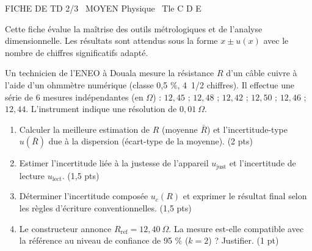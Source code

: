 \documentclass[11pt]{article}
\begin{document}
\begin{tcolorbox}[enhanced,colback=popink,colframe=popink,arc=10pt,boxrule=0pt,left=12pt,right=12pt,top=9pt,bottom=9pt]
{\color{white}\popxbold\small FICHE DE TD 2/3 \textbullet\ MOYEN \hfill Physique \textbullet\ Tle C D E\par}
\end{tcolorbox}
\vspace{4pt}
Cette fiche évalue la maîtrise des outils métrologiques et de l'analyse dimensionnelle. Les résultats sont attendus sous la forme $x \pm u(x)$ avec le nombre de chiffres significatifs adapté.

\begin{exercice}
Un technicien de l'ENEO à Douala mesure la résistance $R$ d'un câble cuivre à l'aide d'un ohmmètre numérique (classe 0,5 \%, 4~1/2 chiffres). Il effectue une série de 6 mesures indépendantes (en $\Omega$) : 
$12,45$ ; $12,48$ ; $12,42$ ; $12,50$ ; $12,46$ ; $12,44$.
L'instrument indique une résolution de $0,01~\Omega$.
\begin{enumerate}
    \item Calculer la meilleure estimation de $R$ (moyenne $\bar{R}$) et l'incertitude-type $u(\bar{R})$ due à la dispersion (écart-type de la moyenne). (2 pts)
    \item Estimer l'incertitude liée à la justesse de l'appareil $u_{\text{just}}$ et l'incertitude de lecture $u_{\text{lect}}$. (1,5 pts)
    \item Déterminer l'incertitude composée $u_c(R)$ et exprimer le résultat final selon les règles d'écriture conventionnelles. (1,5 pts)
    \item Le constructeur annonce $R_{\text{ref}} = 12,40~\Omega$. La mesure est-elle compatible avec la référence au niveau de confiance de 95 \% ($k=2$) ? Justifier. (1 pt)
\end{enumerate}
\end{exercice}
\end{document}
